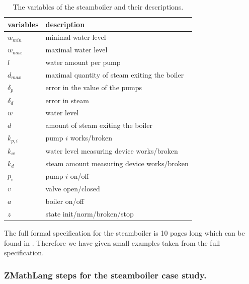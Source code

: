 \begin{table}[H]
\begin{tabular}{l|l}
\textbf{variables} & \textbf{description} \\
\hline
$w_{min}$ & minimal water level \\
$w_{max}$ & maximal water level \\
$l$ & water amount per pump\\
$d_{max}$ & maximal quantity of steam exiting the boiler \\
$\delta_{p}$ & error in the value of the pumps \\
$\delta_{d}$ & error in steam\\
$w$ & water level \\
$d$ &  amount of steam exiting the boiler \\
$k_{p,i}$ & pump $i$ works/broken \\
$k_{w}$ & water level measuring device works/broken \\
$k_{d}$ & steam amount measuring device works/broken\\
$p_{i}$ & pump $i$ on/off \\
$v$ & valve open/closed \\
$a$ & boiler on/off \\
$z$ & state init/norm/broken/stop 
\end{tabular}
\caption{The variables of the steamboiler and their descriptions. \label{tab:steamboilervariables}}
\end{table}

The full formal specification for the steamboiler is 10 pages long which can be
found in \cite{mathlangexamples}. Therefore we have given small examples taken
from the full specification.

\subsubsection{ZMathLang steps for the steamboiler case study.}

